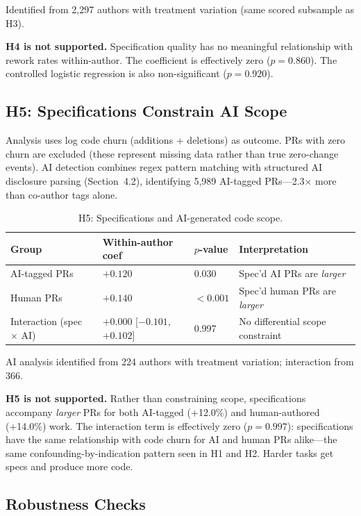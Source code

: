 \documentclass[a4paper,UKenglish,cleveref,autoref,thm-restate]{lipics-v2021}
\begin{document}
Identified from 2,297 authors with treatment variation (same scored subsample as H3).

\textbf{H4 is not supported.} Specification quality has no meaningful relationship with rework rates within-author. The coefficient is effectively zero ($p = 0.860$). The controlled logistic regression is also non-significant ($p = 0.920$).

\subsection{H5: Specifications Constrain AI Scope}

\noindent
Analysis uses log code churn (additions + deletions) as outcome. PRs with zero churn are excluded (these represent missing data rather than true zero-change events). AI detection combines regex pattern matching with structured AI disclosure parsing (Section~4.2), identifying 5,989 AI-tagged PRs---2.3$\times$ more than co-author tags alone.

\begin{table}[t]
\centering
\caption{H5: Specifications and AI-generated code scope.}
\label{tab:h5}
\begin{tabular}{@{}llll@{}}
\toprule
\textbf{Group} & \textbf{Within-author coef} & \textbf{$p$-value} & \textbf{Interpretation} \\
\midrule
AI-tagged PRs & $+0.120$ & 0.030 & Spec'd AI PRs are \emph{larger} \\
Human PRs & $+0.140$ & $< 0.001$ & Spec'd human PRs are \emph{larger} \\
Interaction (spec $\times$ AI) & $+0.000$ [$-0.101$, $+0.102$] & 0.997 & No differential scope constraint \\
\bottomrule
\end{tabular}
\end{table}

AI analysis identified from 224 authors with treatment variation; interaction from 366.

\textbf{H5 is not supported.} Rather than constraining scope, specifications accompany \emph{larger} PRs for both AI-tagged (+12.0\%) and human-authored (+14.0\%) work. The interaction term is effectively zero ($p = 0.997$): specifications have the same relationship with code churn for AI and human PRs alike---the same confounding-by-indication pattern seen in H1 and H2. Harder tasks get specs and produce more code.

\subsection{Robustness Checks}
\end{document}
